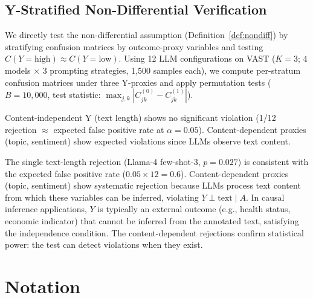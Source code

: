 \subsection{Y-Stratified Non-Differential Verification}
\label{sec:y_stratified_test}

We directly test the non-differential assumption (Definition~\ref{def:nondiff}) by stratifying confusion matrices by outcome-proxy variables and testing $C(Y{=}\text{high}) \approx C(Y{=}\text{low})$. Using 12 LLM configurations on VAST ($K{=}3$; 4 models $\times$ 3 prompting strategies, 1{,}500 samples each), we compute per-stratum confusion matrices under three Y-proxies and apply permutation tests ($B{=}10{,}000$, test statistic: $\max_{j,k} |C^{(0)}_{jk} - C^{(1)}_{jk}|$).

Content-independent Y (text length) shows no significant violation (1/12 rejection $\approx$ expected false positive rate at $\alpha{=}0.05$). Content-dependent proxies (topic, sentiment) show expected violations since LLMs observe text content.

\begin{table}[H]
\centering
\small
\caption{Y-stratified non-differential test.}
\label{tab:y_stratified}
\end{table}

The single text-length rejection (Llama-4 few-shot-3, $p{=}0.027$) is consistent with the expected false positive rate ($0.05 \times 12 = 0.6$). Content-dependent proxies (topic, sentiment) show systematic rejection because LLMs process text content from which these variables can be inferred, violating $Y \perp \text{text} \mid A$. In causal inference applications, $Y$ is typically an external outcome (e.g., health status, economic indicator) that cannot be inferred from the annotated text, satisfying the independence condition. The content-dependent rejections confirm statistical power: the test can detect violations when they exist.

\section{Notation}
\label{app:notation_table}

